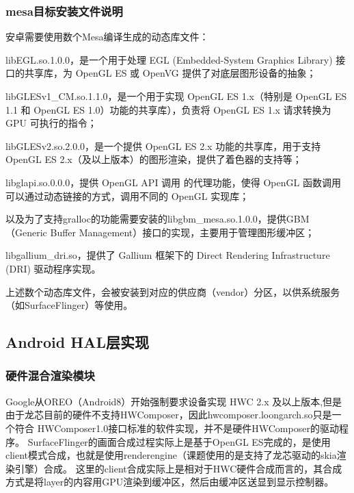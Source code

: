 \subsubsection{mesa目标安装文件说明}

安卓需要使用数个Mesa编译生成的动态库文件：

libEGL.so.1.0.0，是一个用于处理 EGL (Embedded-System Graphics Library) 接口的共享库，为 OpenGL ES 或 OpenVG 提供了对底层图形设备的抽象；

libGLESv1\_CM.so.1.1.0，是一个用于实现 OpenGL ES 1.x（特别是 OpenGL ES 1.1 和 OpenGL ES 1.0）功能的共享库），负责将 OpenGL ES 1.x 请求转换为 GPU 可执行的指令；

libGLESv2.so.2.0.0，是一个提供 OpenGL ES 2.x 功能的共享库，用于支持 OpenGL ES 2.x（及以上版本）的图形渲染，提供了着色器的支持等；

libglapi.so.0.0.0，提供 OpenGL API 调用 的代理功能，使得 OpenGL 函数调用可以通过动态链接的方式，调用不同的 OpenGL 实现库；

以及为了支持gralloc的功能需要安装的libgbm\_mesa.so.1.0.0，提供GBM（Generic Buffer Management）接口的实现，主要用于管理图形缓冲区；

libgallium\_dri.so，提供了 Gallium 框架下的 Direct Rendering Infrastructure (DRI) 驱动程序实现。

上述数个动态库文件，会被安装到对应的供应商（vendor）分区，以供系统服务（如SurfaceFlinger）等使用。

\subsection{Android HAL层实现}

\subsubsection{硬件混合渲染模块}
Google从OREO（Android8）开始强制要求设备实现 HWC 2.x 及以上版本,但是由于龙芯目前的硬件不支持HWComposer，因此hwcomposer.loongarch.so只是一个符合
HWComposer1.0接口标准的软件实现，并不是硬件HWComposer的驱动程序。
SurfaceFlinger的画面合成过程实际上是基于OpenGL ES完成的，是使用client模式合成，也就是使用renderengine（课题使用的是支持了龙芯驱动的skia渲染引擎）合成。
这里的client合成实际上是相对于HWC硬件合成而言的，其合成方式是将layer的内容用GPU渲染到缓冲区，然后由缓冲区送显到显示控制器。

